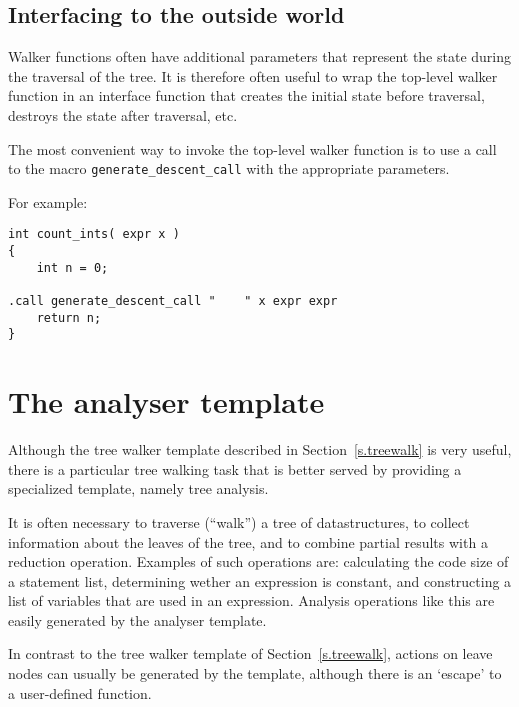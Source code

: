 \subsection{Interfacing to the outside world}
Walker functions often have additional parameters that represent
the state during the traversal of the tree. It is therefore often
useful to wrap the top-level walker function in an interface function
that creates the initial state before traversal, destroys the state
after traversal, etc. 
\par
The most convenient way to invoke the top-level walker function is to
use a call to the macro \verb'generate_descent_call' with the appropriate
parameters.
\par
For example:
\begin{verbatim}
int count_ints( expr x )
{
    int n = 0;

.call generate_descent_call "    " x expr expr
    return n;
}
\end{verbatim}
\section{The analyser template}
\label{s.analyser}
Although the tree walker template described in Section~\ref{s.treewalk}
is very useful, there is a particular tree walking task that is better
served by providing a specialized template, namely tree analysis.

It is often necessary to traverse (``walk'') a tree of datastructures, to
collect information about the leaves of the tree, and to combine partial
results with a reduction operation.  Examples of such operations are:
calculating the code size of a statement list, determining wether an
expression is constant, and constructing a list of variables that are
used in an expression. Analysis operations like this are easily generated
by the analyser template.

In contrast to the tree walker template of Section~\ref{s.treewalk},
actions on leave nodes can usually be generated by the template, although
there is an `escape' to a user-defined function.

